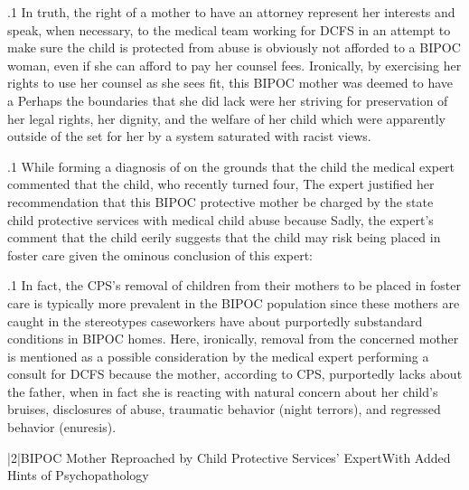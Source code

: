 \documentclass[11pt, twoside]{article}
\begin{document}
{\p.1{%
In truth, the right of a mother to have an attorney represent her interests and speak, when necessary, to the medical team working for DCFS
in an attempt to make sure the child is protected from abuse is obviously
not afforded to a BIPOC woman, even if she can afford to pay her counsel fees. Ironically, by exercising her rights to use her counsel as she sees
fit, this BIPOC mother was deemed to have a  Perhaps the boundaries that she did lack were her striving for preservation
of her legal rights, her dignity, and the welfare of her child which were
apparently outside of the  set for her by a system saturated
with racist views.
}%

\p.1{%
While forming a diagnosis of  on the grounds
that the child  the medical expert commented that the child, who recently turned four,  The expert justified her recommendation that this BIPOC protective mother be
charged by the state child protective services with medical child abuse
because  Sadly, the expert's comment
that the child  eerily suggests
that the child may risk being placed in foster care given the ominous
conclusion of this expert: 
}%

\p.1{%
In fact, the CPS's removal of children from their mothers to be placed
in foster care is typically more prevalent in the BIPOC population
since these mothers are caught in the stereotypes caseworkers have
about purportedly substandard conditions in BIPOC homes. Here, ironically, removal from the concerned mother is mentioned as a possible
consideration by the medical expert performing a consult for DCFS
because the mother, according to CPS, purportedly lacks 
about the father, when in fact she is reacting with natural concern
about her child's bruises, disclosures of abuse, traumatic behavior (night
terrors), and regressed behavior (enuresis).
}%


\s|2|{BIPOC Mother Reproached by Child Protective Services' Expert\mdash{}With Added Hints of Psychopathology}

}
\end{document}
